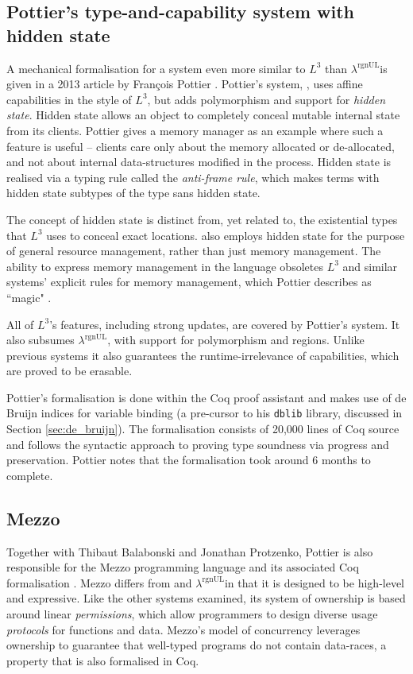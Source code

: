 \documentclass[]{unswthesis}
\newcommand{\rgnUL}{$\lambda^\text{rgnUL}$\text{ }}
\newcommand{\SSPHS}{\text{SSPHS }}
\newcommand{\Francois}{Fran\frenchc{c}ois }
\let\frenchc\c
\let\c\texttt
\let\i\textit
\begin{document}
\subsection{Pottier's type-and-capability system with hidden state}

A mechanical formalisation for a system even more similar to $L^3$ than \rgnUL is given in a 2013 article by \Francois Pottier \cite{pottier13}. Pottier's system, \SSPHS, uses affine capabilities in the style of $L^3$, but adds polymorphism and support for \i{hidden state}. Hidden state allows an object to completely conceal mutable internal state from its clients. Pottier gives a memory manager as an example where such a feature is useful -- clients care only about the memory allocated or de-allocated, and not about internal data-structures modified in the process. Hidden state is realised via a typing rule called the \i{anti-frame rule}, which makes terms with hidden state subtypes of the type sans hidden state.

The concept of hidden state is distinct from, yet related to, the existential types that $L^3$ uses to conceal exact locations. \SSPHS also employs hidden state for the purpose of general resource management, rather than just memory management. The ability to express memory management in the language obsoletes $L^3$ and similar systems' explicit rules for memory management, which Pottier describes as ``magic" \cite{pottier13}.

All of $L^3$'s features, including strong updates, are covered by Pottier's system. It also subsumes \rgnUL, with support for polymorphism and regions. Unlike previous systems it also guarantees the runtime-irrelevance of capabilities, which are proved to be erasable.

Pottier's formalisation is done within the Coq proof assistant and makes use of de Bruijn indices for variable binding (a pre-cursor to his \c{dblib} library, discussed in Section \ref{sec:de_bruijn}). The formalisation consists of 20,000 lines of Coq source and follows the syntactic approach to proving type soundness via progress and preservation. Pottier notes that the formalisation took around 6 months to complete.

\subsection{Mezzo}

Together with Thibaut Balabonski and Jonathan Protzenko, Pottier is also responsible for the Mezzo programming language and its associated Coq formalisation \cite{mezzo14}. Mezzo differs from \SSPHS and \rgnUL in that it is designed to be high-level and expressive. Like the other systems examined, its system of ownership is based around linear \i{permissions}, which allow programmers to design diverse usage \i{protocols} for functions and data. Mezzo's model of concurrency leverages ownership to guarantee that well-typed programs do not contain data-races, a property that is also formalised in Coq.
\end{document}
